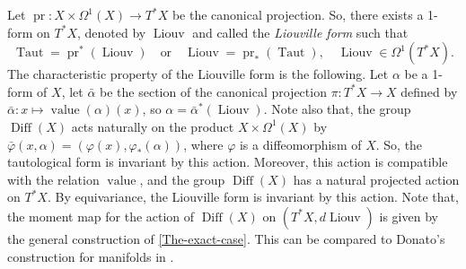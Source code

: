 \documentclass[10pt,reqno,twoside]{amsart}
\newcommand{\qmbox}[1]{\quad\mbox{#1}\quad}
\DeclareMathOperator{\pr}{pr}
\DeclareMathOperator{\Diff}{Diff}
\DeclareMathOperator{\Taut}{Taut}
\DeclareMathOperator{\Liouv}{Liouv}
\DeclareMathOperator{\Value}{value}
\newcommand{\T}{T}
\theoremstyle{plain}
\theoremstyle{definition}
\begin{document}
  Let $\pr : X \times \Omega^1(X) \to \T^*X$ be the canonical projection.
  So,
  there exists a 1-form on $\T^*X$,
  denoted by $\Liouv$ and called the {\em Liouville form} such that
  $$
    \Taut = \pr^*(\Liouv) \qmbox{or} \Liouv = \pr_*(\Taut), \quad \Liouv \in \Omega^1(\T^*X).
    $$
  The characteristic property of the Liouville form is the following.
  Let $\alpha$ be a 1-form of $X$,
  let $\bar \alpha$ be the section of the canonical projection $\pi : \T^*X \to X$ defined by $\bar \alpha : x \mapsto \Value(\alpha)(x)$,
  so $\alpha = \bar \alpha^*(\Liouv)$.
  Note also that,
  the group $\Diff(X)$ acts naturally on the product $X \times \Omega^1(X)$ by $\bar \varphi(x,\alpha) = (\varphi(x), \varphi_*(\alpha))$,
  where $\varphi$ is a diffeomorphism of $X$.
  So,
  the tautological form is invariant by this action.
  Moreover,
  this action is compatible with the relation $\Value$,
  and the group $\Diff(X)$ has a natural projected action on $\T^*X$.
  By equivariance,
  the Liouville form is invariant by this action.
  Note that,
  the moment map for the action of $\Diff(X)$ on $(\T^*X, d\Liouv)$ is given by the general construction of \ref{The-exact-case}.
  This can be compared to Donato's construction for manifolds in \cite{Don88}.
  
\end{document}
